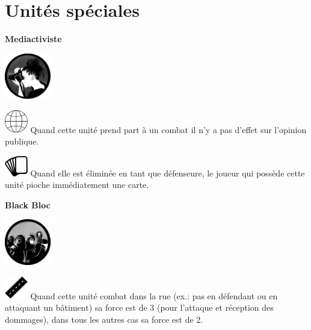 \documentclass[a4paper,13pt]{scrartcl}
\begin{document}
\section*{Unités spéciales}
\begin{minipage}[c]{0.2\textwidth}
\centering
\textbf{Mediactiviste}
\smallskip

\includegraphics[width=2cm]{special_units-mediaactivist.png}
\end{minipage}\hfill
\begin{minipage}[c]{0.75\textwidth}
\includegraphics[width=1cm]{po.png} Quand cette unité prend part à un combat il n'y a pas d'effet sur l'opinion publique.
\smallskip

\includegraphics[width=1cm]{card.png} Quand elle est éliminée en tant que défenseure, le joueur qui possède cette unité pioche immédiatement une carte.
\end{minipage}
\bigskip

\begin{minipage}[c]{0.2\textwidth}
	\centering
	\textbf{Black Bloc}
	\smallskip
	
	\includegraphics[width=2cm]{special_units-blackblock.png}
\end{minipage}\hfill
\begin{minipage}[c]{0.75\textwidth}
	\includegraphics[width=1cm]{street.png} Quand cette unité combat dans la rue (ex.: pas en défendant ou en attaquant un bâtiment) sa force est de 3 (pour l'attaque et réception des dommages), dans tous les autres cas sa force est de 2.
\end{minipage}
\bigskip
\end{document}

